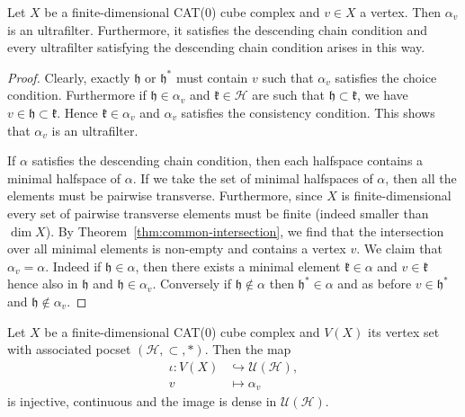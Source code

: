 \begin{lemma}
  \label{lem:principle-uf}
  Let \(X\) be a finite-dimensional CAT(0) cube complex and \(v \in X\) a vertex. Then \(\alpha_v\) is an ultrafilter. Furthermore, it satisfies the descending chain condition and every ultrafilter satisfying the descending chain condition arises in this way.
\end{lemma}

\begin{proof}
  Clearly, exactly \(\mathfrak{h}\) or \(\mathfrak{h}^\ast\) must contain \(v\) such that \(\alpha_v\) satisfies the choice condition. Furthermore if \(\mathfrak{h} \in \alpha_v\) and \(\mathfrak{k} \in \mathcal{H}\) are such that \(\mathfrak{h} \subset \mathfrak{k}\), we have \(v \in \mathfrak{h} \subset \mathfrak{k}\). Hence \(\mathfrak{k} \in \alpha_v\) and \(\alpha_v\) satisfies the consistency condition. This shows that \(\alpha_v\) is an ultrafilter.

    If \(\alpha\) satisfies the descending chain condition, then each halfspace contains a minimal halfspace of \(\alpha\). If we take the set of minimal halfspaces of \(\alpha\), then all the elements must be pairwise transverse. Furthermore, since \(X\) is finite-dimensional every set of pairwise transverse elements must be finite (indeed smaller than \(\dim X\)). By Theorem~\ref{thm:common-intersection}, we find that the intersection over all minimal elements is non-empty and contains a vertex \(v\). We claim that \(\alpha_v = \alpha\). Indeed if \(\mathfrak{h} \in \alpha\), then there exists a minimal element \(\mathfrak{k} \in \alpha\) and \(v \in \mathfrak{k}\) hence also in \(\mathfrak{h}\) and \(\mathfrak{h} \in \alpha_v\). Conversely if \(\mathfrak{h} \not \in \alpha\) then \(\mathfrak{h}^\ast \in \alpha\) and as before \(v \in \mathfrak{h}^\ast\) and \(\mathfrak{h} \not \in \alpha_v\).
\end{proof}

\begin{thm}
  \label{thm:roller-compactification}
  Let \(X\) be a finite-dimensional CAT(0) cube complex and \(V(X)\) its vertex set with associated pocset \((\mathcal{H}, \subset, \ast)\). Then the map
  \begin{align*}
    \iota\colon V(X) &\hookrightarrow \mathcal{U}(\mathcal{H}),\\
    v &\mapsto \alpha_v
  \end{align*}
  is injective, continuous and the image is dense in \(\mathcal{U}(\mathcal{H})\). 
\end{thm}

